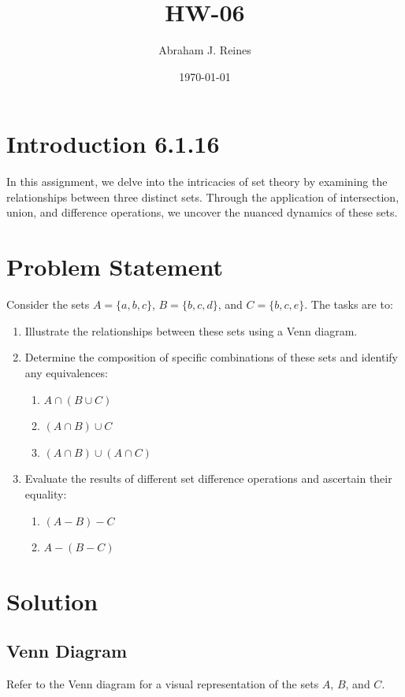 \documentclass[12pt]{article}
\begin{document}
\doublespacing %

\title{HW-06}
\author{Abraham J. Reines}
\date{\today}
\maketitle

\section*{Introduction 6.1.16}
In this assignment, we delve into the intricacies of set theory by examining the relationships between three distinct sets. Through the application of intersection, union, and difference operations, we uncover the nuanced dynamics of these sets.

\section*{Problem Statement}
Consider the sets \( A = \{ a, b, c \} \), \( B = \{ b, c, d \} \), and \( C = \{ b, c, e \} \). The tasks are to:
\begin{enumerate}[label=\alph*.]
    \item Illustrate the relationships between these sets using a Venn diagram.
    \item Determine the composition of specific combinations of these sets and identify any equivalences:
    \begin{enumerate}[label=\arabic*.]
        \item \( A \cap (B \cup C) \)
        \item \( (A \cap B) \cup C \)
        \item \( (A \cap B) \cup (A \cap C) \)
    \end{enumerate}
    \item Evaluate the results of different set difference operations and ascertain their equality:
    \begin{enumerate}[label=\arabic*.]
        \item \( (A - B) - C \)
        \item \( A - (B - C) \)
    \end{enumerate}
\end{enumerate}

\section*{Solution}
\subsection*{Venn Diagram}
Refer to the Venn diagram for a visual representation of the sets \( A \), \( B \), and \( C \).
\end{document}
